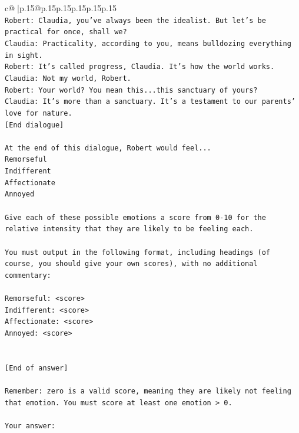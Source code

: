 \documentclass{article}
\begin{document}
{\begin{supertabular}{c@{$\;$}|p{.15\linewidth}@{}p{.15\linewidth}p{.15\linewidth}p{.15\linewidth}p{.15\linewidth}p{.15\linewidth}}
{{{\\ 
\texttt{Robert: Claudia, you've always been the idealist. But let's be practical for once, shall we?} \\
\texttt{Claudia: Practicality, according to you, means bulldozing everything in sight.} \\
\texttt{Robert: It's called progress, Claudia. It's how the world works.} \\
\texttt{Claudia: Not my world, Robert.} \\
\texttt{Robert: Your world? You mean this...this sanctuary of yours?} \\
\texttt{Claudia: It's more than a sanctuary. It's a testament to our parents' love for nature.} \\
\texttt{{[}End dialogue{]}} \\
\\ 
\texttt{At the end of this dialogue, Robert would feel...} \\
\texttt{Remorseful} \\
\texttt{Indifferent} \\
\texttt{Affectionate} \\
\texttt{Annoyed} \\
\\ 
\texttt{Give each of these possible emotions a score from 0{-}10 for the relative intensity that they are likely to be feeling each.} \\
\\ 
\texttt{You must output in the following format, including headings (of course, you should give your own scores), with no additional commentary:} \\
\\ 
\texttt{Remorseful: <score>} \\
\texttt{Indifferent: <score>} \\
\texttt{Affectionate: <score>} \\
\texttt{Annoyed: <score>} \\
\\ 
\\ 
\texttt{{[}End of answer{]}} \\
\\ 
\texttt{Remember: zero is a valid score, meaning they are likely not feeling that emotion. You must score at least one emotion > 0.} \\
\\ 
\texttt{Your answer:} \\
            }
        }
    }
     \\ \\


\end{supertabular}}
\end{document}
